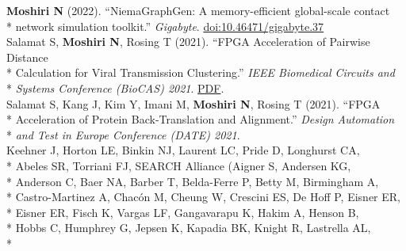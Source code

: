 \documentclass[margin,line]{res}
\begin{document}
\begin{resume}
\hspace*{4mm} \textbf{Moshiri N} (2022). ``NiemaGraphGen: A memory-efficient global-scale contact\\*\vspace{2mm}
\hspace*{8mm} network simulation toolkit.'' \textit{Gigabyte}. \href{https://doi.org/10.46471/gigabyte.37}{doi:10.46471/gigabyte.37}\\
\hspace*{4mm} Salamat S, \textbf{Moshiri N}, Rosing T (2021). ``FPGA Acceleration of Pairwise Distance\\*
\hspace*{9.5mm} Calculation for Viral Transmission Clustering.'' \textit{IEEE Biomedical Circuits and}\\*\vspace{2mm}
\hspace*{8mm} \textit{Systems Conference (BioCAS) 2021}. \href{https://par.nsf.gov/servlets/purl/10323850}{PDF}.\\
\hspace*{4mm} Salamat S, Kang J, Kim Y, Imani M, \textbf{Moshiri N}, Rosing T (2021). ``FPGA\\*
\hspace*{9.5mm} Acceleration of Protein Back-Translation and Alignment.'' \textit{Design Automation}\\*\vspace{2mm}
\hspace*{8mm} \textit{and Test in Europe Conference (DATE) 2021}.\\
\hspace*{4mm} Keehner J, Horton LE, Binkin NJ, Laurent LC, Pride D, Longhurst CA,\\*
\hspace*{9.5mm} Abeles SR, Torriani FJ, SEARCH Alliance (Aigner S, Andersen KG,\\*
\hspace*{9.5mm} Anderson C, Baer NA, Barber T, Belda-Ferre P, Betty M, Birmingham A,\\*
\hspace*{9.5mm} Castro-Martinez A, Chac\'on M, Cheung W, Crescini ES, De Hoff P, Eisner ER,\\*
\hspace*{9.5mm} Eisner ER, Fisch K, Vargas LF, Gangavarapu K, Hakim A, Henson B,\\*
\hspace*{9.5mm} Hobbs C, Humphrey G, Jepsen K, Kapadia BK, Knight R, Lastrella AL,\\*

\end{resume}
\end{document}
